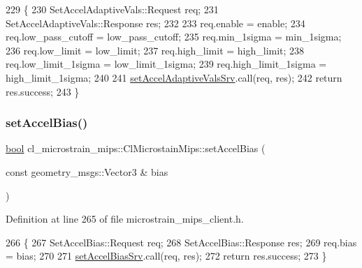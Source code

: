 \begin{DoxyCode}
229     \{
230         SetAccelAdaptiveVals::Request req;
231         SetAccelAdaptiveVals::Response res;
232 
233         req.enable = enable;
234         req.low\_pass\_cutoff = low\_pass\_cutoff;
235         req.min\_1sigma = min\_1sigma;
236         req.low\_limit = low\_limit;
237         req.high\_limit = high\_limit;
238         req.low\_limit\_1sigma = low\_limit\_1sigma;
239         req.high\_limit\_1sigma = high\_limit\_1sigma;
240 
241         \hyperlink{classcl__microstrain__mips_1_1ClMicrostainMips_a0e22727b68e51261aa65605f236419e6}{setAccelAdaptiveValsSrv}.call(req, res);
242         \textcolor{keywordflow}{return} res.success;
243     \}
\end{DoxyCode}
\mbox{\label{classcl__microstrain__mips_1_1ClMicrostainMips_a535b7afce9ff4288c94077fe8fc30f79}} 
\subsubsection{\texorpdfstring{set\+Accel\+Bias()}{setAccelBias()}}
{\footnotesize\ttfamily \hyperlink{classbool}{bool} cl\+\_\+microstrain\+\_\+mips\+::\+Cl\+Microstain\+Mips\+::set\+Accel\+Bias (\begin{DoxyParamCaption}\item[{const geometry\+\_\+msgs\+::\+Vector3 \&}]{bias }\end{DoxyParamCaption})\hspace{0.3cm}{\ttfamily [inline]}}



Definition at line 265 of file microstrain\+\_\+mips\+\_\+client.\+h.


\begin{DoxyCode}
266     \{
267         SetAccelBias::Request req;
268         SetAccelBias::Response res;
269         req.bias = bias;
270 
271         \hyperlink{classcl__microstrain__mips_1_1ClMicrostainMips_ae2ea11655cba06e49307780d1f95e197}{setAccelBiasSrv}.call(req, res);
272         \textcolor{keywordflow}{return} res.success;
273     \}
\end{DoxyCode}
\mbox{\label{classcl__microstrain__mips_1_1ClMicrostainMips_a809131028b774a3026a3f6894db0dc8f}} 
